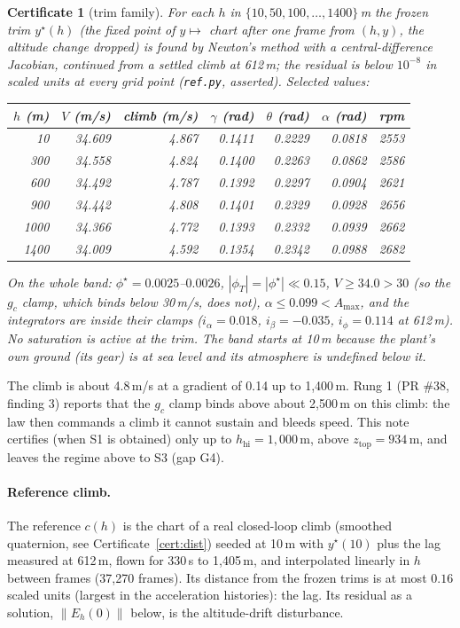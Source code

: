 \documentclass[11pt]{article}
\newtheorem{cert}{Certificate}
\newcommand{\zTop}{z_{\mathrm{top}}}
\begin{document}
\begin{cert}[trim family]\label{cert:trim}
For each $h$ in $\{10, 50, 100, \dots, 1400\}$\,m the frozen trim $y^\star(h)$ (the fixed point of $y \mapsto$ chart after one frame from $(h, y)$, the altitude change dropped) is found by Newton's method with a central-difference Jacobian, continued from a settled climb at 612\,m; the residual is below $10^{-8}$ in scaled units at every grid point (\texttt{ref.py}, asserted). Selected values:

\begin{center}
\begin{tabular}{rrrrrrr}
\toprule
$h$ (m) & $V$ (m/s) & climb (m/s) & $\gamma$ (rad) & $\theta$ (rad) & $\alpha$ (rad) & rpm\\
\midrule
10 & 34.609 & 4.867 & 0.1411 & 0.2229 & 0.0818 & 2553\\
300 & 34.558 & 4.824 & 0.1400 & 0.2263 & 0.0862 & 2586\\
600 & 34.492 & 4.787 & 0.1392 & 0.2297 & 0.0904 & 2621\\
900 & 34.442 & 4.808 & 0.1401 & 0.2329 & 0.0928 & 2656\\
1000 & 34.366 & 4.772 & 0.1393 & 0.2332 & 0.0939 & 2662\\
1400 & 34.009 & 4.592 & 0.1354 & 0.2342 & 0.0988 & 2682\\
\bottomrule
\end{tabular}
\end{center}
On the whole band: $\phi^\star = 0.0025$--$0.0026$, $|\phi_T| = |\phi^\star| \ll 0.15$, $V \ge 34.0 > 30$ (so the $g_c$ clamp, which binds below 30\,m/s, does not), $\alpha \le 0.099 < A_{\max}$, and the integrators are inside their clamps ($i_\alpha = 0.018$, $i_\beta = -0.035$, $i_\phi = 0.114$ at 612\,m). No saturation is active at the trim. The band starts at 10\,m because the plant's own ground (its gear) is at sea level and its atmosphere is undefined below it.
\end{cert}

The climb is about 4.8\,m/s at a gradient of 0.14 up to 1{,}400\,m. Rung 1 (PR \#38, finding 3) reports that the $g_c$ clamp binds above about 2{,}500\,m on this climb: the law then commands a climb it cannot sustain and bleeds speed. This note certifies (when S1 is obtained) only up to $h_{\mathrm{hi}} = 1{,}000$\,m, above $\zTop = 934$\,m, and leaves the regime above to S3 (gap G4).

\paragraph{Reference climb.} The reference $c(h)$ is the chart of a real closed-loop climb (smoothed quaternion, see Certificate~\ref{cert:dist}) seeded at 10\,m with $y^\star(10)$ plus the lag measured at 612\,m, flown for 330\,s to 1{,}405\,m, and interpolated linearly in $h$ between frames (37{,}270 frames). Its distance from the frozen trims is at most $0.16$ scaled units (largest in the acceleration histories): the lag. Its residual as a solution, $\|E_h(0)\|$ below, is the altitude-drift disturbance.
\end{document}

